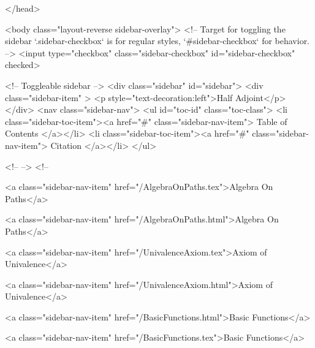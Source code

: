   
</head>




  <body class="layout-reverse sidebar-overlay">
    <!-- Target for toggling the sidebar `.sidebar-checkbox` is for regular
     styles, `#sidebar-checkbox` for behavior. -->
<input type="checkbox" class="sidebar-checkbox" id="sidebar-checkbox" checked>

<!-- Toggleable sidebar -->
<div class="sidebar" id="sidebar">
  <div class="sidebar-item" >
    <p style="text-decoration:left">Half Adjoint</p>
  </div>
  <nav class="sidebar-nav">
    <ul id="toc-id" class="toc-class">
  <li class="sidebar-toc-item"><a href="#" class="sidebar-nav-item"> Table of Contents </a></li>
  <li class="sidebar-toc-item"><a href="#" class="sidebar-nav-item"> Citation </a></li>
</ul>


    <!--  -->
    <!-- 
      
    
      
    
      
    
      
        
      
    
      
        
          <a class="sidebar-nav-item" href="/AlgebraOnPaths.tex">Algebra On Paths</a>
        
      
    
      
        
          <a class="sidebar-nav-item" href="/AlgebraOnPaths.html">Algebra On Paths</a>
        
      
    
      
        
          <a class="sidebar-nav-item" href="/UnivalenceAxiom.tex">Axiom of Univalence</a>
        
      
    
      
        
          <a class="sidebar-nav-item" href="/UnivalenceAxiom.html">Axiom of Univalence</a>
        
      
    
      
        
          <a class="sidebar-nav-item" href="/BasicFunctions.html">Basic Functions</a>
        
      
    
      
        
          <a class="sidebar-nav-item" href="/BasicFunctions.tex">Basic Functions</a>
        
      
    
